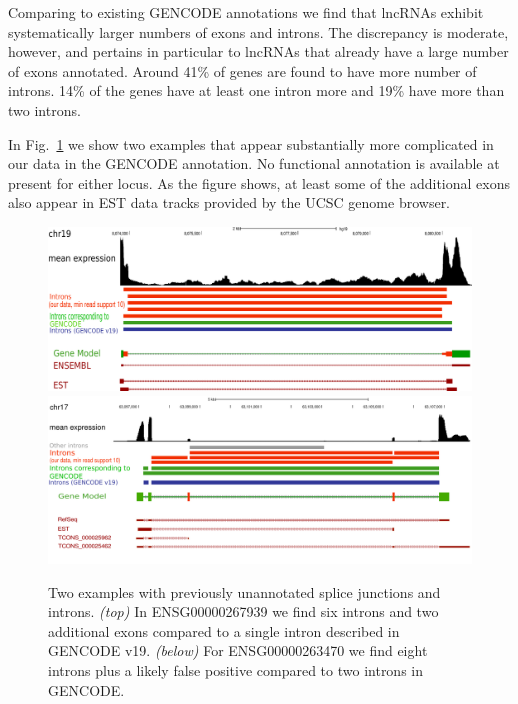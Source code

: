 \documentclass[ncrna,article,submit,moreauthors,pdftex,10pt,a4paper]{mdpi}
\begin{document}
Comparing to existing GENCODE annotations we find that lncRNAs exhibit
systematically larger numbers of exons and introns. The
discrepancy is moderate, however, and pertains in particular to lncRNAs
that already have a large number of exons annotated.  Around 41\% of genes
are found to have more number of introns. 14\% of the genes have at least
one intron more and 19\% have more than two introns.

In Fig.~\ref{fig:examples} we show two examples that appear substantially
more complicated in our data in the GENCODE annotation. No functional
annotation is available at present for either locus. As the figure shows,
at least some of the additional exons also appear in EST data tracks
provided by the UCSC genome browser.

\begin{figure}[t]
\begin{center}
\includegraphics[width=\textwidth]{267939.pdf}\\[1em]
\includegraphics[width=\textwidth]{example.pdf}
\end{center}
\caption{Two examples with previously unannotated splice junctions and
  introns.  \emph{(top)} In ENSG00000267939 we find six introns and two additional
  exons compared to a single intron described in GENCODE v19.  \emph{(below)} For
  ENSG00000263470 we find eight introns plus a likely false positive compared
  to two introns in GENCODE.}
\label{fig:examples} 
\end{figure}
\end{document}

